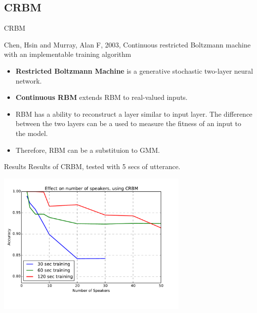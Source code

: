 

\subsection{CRBM}

\begin{frame}{CRBM}
  \begin{reference}{4mm}{85mm}
Chen, Hsin and Murray, Alan F, 2003,
Continuous restricted Boltzmann machine with an implementable training algorithm
  \end{reference}
  \begin{itemize}
    \item \textbf{Restricted Boltzmann Machine} is a generative stochastic two-layer neural network.

    \item \textbf{Continuous RBM} extends RBM to real-valued inputs.
      \pause
    \item RBM has a ability to reconstruct a layer similar to input layer.
      The difference between the two layers can be a used to measure the fitness of an input to the model.

    \item Therefore, RBM can be a substituion to GMM.
  \end{itemize}


\end{frame}

\begin{frame}{Results}
  Results of CRBM, tested with 5 secs
  of utterance.
  \begin{center}
    \includegraphics[width=0.7\textwidth]{res/crbm.pdf}
  \end{center}
\end{frame}

